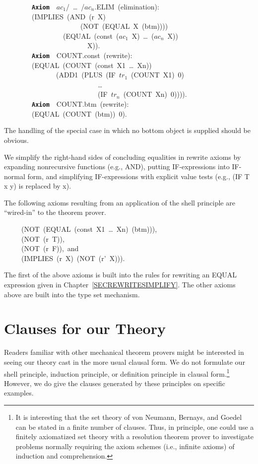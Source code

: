 \documentclass[11pt]{book}
\newenvironment{pubasis}{\begin{flushleft}\ttfamily\small}{\normalsize\rmfamily\end{flushleft}}
\newcommand{\axiomordefinition}[1]{\vspace{6pt}\texttt{\textbf{#1}}}
\newcommand{\pubdefaulttextsize}{\large}
\begin{document}
\begin{pubasis}
~~~~~~~~\axiomordefinition{Axiom}~~$ac_{1}$/~\ldots{}~/$ac_{n}$.ELIM~(elimination):\\
~~~~~~~~(IMPLIES~(AND~(r~X)\\
~~~~~~~~~~~~~~~~~~~~~~(NOT~(EQUAL~X~(btm))))\\
~~~~~~~~~~~~~~~~~(EQUAL~(const~($ac_{1}$~X)~\ldots{}~($ac_{n}$~X))\\
~~~~~~~~~~~~~~~~~~~~~~~~X)).\\

~~~~~~~~\axiomordefinition{Axiom}~~COUNT.const~(rewrite):\\
~~~~~~~~(EQUAL~(COUNT~(const~X1~\ldots{}~Xn))\\
~~~~~~~~~~~~~~~(ADD1~(PLUS~(IF~$tr_{1}$~(COUNT~X1)~0)\\
~~~~~~~~~~~~~~~~~~~~~~~~~~~\ldots{}\\
~~~~~~~~~~~~~~~~~~~~~~~~~~~(IF~$tr_{n}$~(COUNT~Xn)~0)))).\\

~~~~~~~~\axiomordefinition{Axiom}~~COUNT.btm~(rewrite):\\
~~~~~~~~(EQUAL~(COUNT~(btm))~0).\\
\end{pubasis}
The handling of the special case in which no bottom object is supplied
should be obvious.

We simplify the right-hand sides of concluding equalities in rewrite
axioms by expanding nonrecursive functions (e.g., AND), putting
IF-expressions into IF-normal form, and simplifying
IF-expressions with explicit value tests (e.g., (IF T x y) is replaced by x).

The following axioms resulting from an application of the shell principle are 
``wired-in'' to the theorem prover.
\begin{pubasis}
~~~~~(NOT~(EQUAL~(const~X1~\ldots{}~Xn)~(btm))),\\
~~~~~(NOT~(r~T)),\\
~~~~~(NOT~(r~F)),~and\\
~~~~~(IMPLIES~(r~X)~(NOT~(r'~X))).\\
\end{pubasis}
The first of the above axioms is built into the rules for
rewriting an EQUAL expression given in Chapter~\ref{SECREWRITESIMPLIFY}.
The other axioms above are built into the type set
mechanism.
\chapter{Clauses for our Theory}
\label{APPCLAUSES}
\pubdefaulttextsize
Readers familiar with other mechanical theorem provers might be interested
in seeing our theory cast in the more usual clausal form.  We
do not formulate our shell principle, induction principle, or definition
principle in clausal form.\footnote{It is interesting that the set theory of von Neumann, Bernays, and Goedel \cite{GOEDEL} can be stated in a finite number of clauses. Thus, in principle, one could use a finitely axiomatized set theory with a resolution theorem prover to investigate problems normally requiring  the axiom schemes (i.e., infinite axioms) of induction and comprehension.}
However, we do give the clauses generated
by these principles on specific examples.
\end{document}
